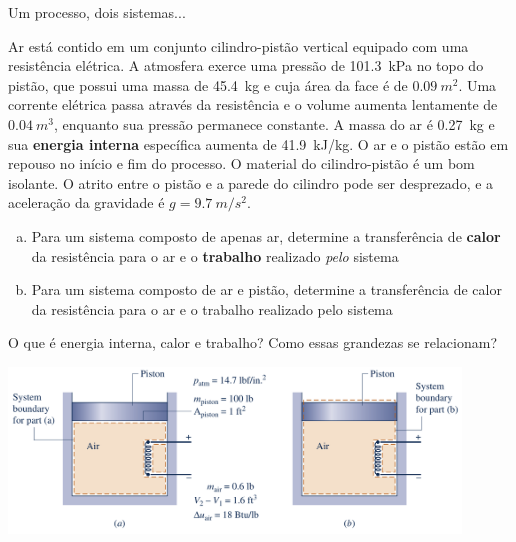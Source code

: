\begin{frame}{Um processo, dois sistemas...}
    \begin{minipage}{\textwidth}
        Ar está contido em um conjunto cilindro-pistão vertical equipado com uma resistência
        elétrica. A atmosfera exerce uma pressão de \SI{101.3}{kPa} no topo do pistão, que possui
        uma massa de \SI{45.4}{kg} e cuja área da face é de \(\SI{0.09}{m^2}\). Uma corrente 
        elétrica passa através da resistência e o volume aumenta lentamente de \(\SI{0.04}{m^3}\),
        enquanto sua pressão permanece constante. A massa do ar é \SI{0.27}{kg} e sua \textbf{energia interna}
        específica aumenta de \SI{41.9}{kJ/kg}. O ar e o pistão estão em repouso no início e fim do processo.
        O material do cilindro-pistão é um bom isolante. O atrito entre o pistão e a parede do cilindro pode ser 
        desprezado, e a aceleração da gravidade é \(g=\SI{9.7}{m/s^2}\).
    \end{minipage}
    \begin{enumerate}[(a)]
        \item Para um sistema composto de apenas ar, determine a transferência de \textbf{calor} da resistência para o ar 
            e o \textbf{trabalho} realizado \textit{pelo} sistema
        \item Para um sistema composto de ar e pistão, determine a transferência de calor da resistência para o ar 
            e o trabalho realizado pelo sistema
    \end{enumerate}

    \pause

    \begin{tcolorbox}[colback=red!20]
        O que é energia interna, calor e trabalho? Como essas grandezas se relacionam?
    \end{tcolorbox}
\end{frame}

\begin{frame}[c]
    \centering
    \includegraphics[width=0.9\textwidth]{images/Captura de tela de 2023-03-29 08-03-41.png}
\end{frame}

